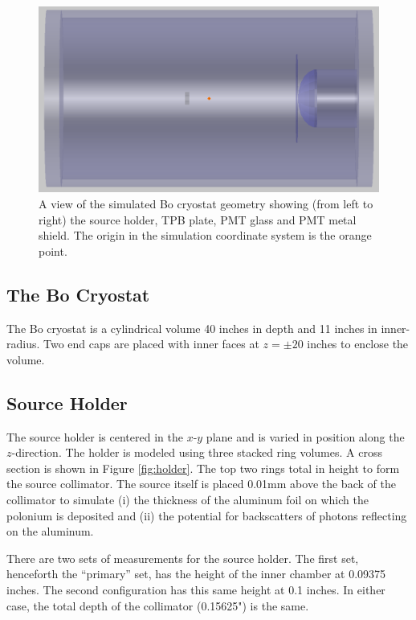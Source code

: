 \documentclass[aps,pra,groupedaddress]{revtex4-1}
\begin{document}
\begin{figure}
	\includegraphics[width=1.0\textwidth]{figures/geo_overview}
	\caption{A view of the simulated Bo cryostat geometry showing (from left to right) the source holder, TPB plate, PMT glass and PMT metal shield. The origin in the simulation coordinate system is the orange point. \label{fig:geo}}
\end{figure}

\subsection{The Bo Cryostat}

The Bo cryostat is a cylindrical volume 40 inches in depth and 11 inches in inner-radius. Two end caps are placed with inner faces at $z=\pm 20$ inches to enclose the volume. 

\subsection{Source Holder}

The source holder is centered in the $x$-$y$ plane and is varied in position along the $z$-direction. The holder is modeled using three stacked ring volumes. A cross section is shown in Figure \ref{fig:holder}. The top two rings total in height to form the source collimator. The source itself is placed 0.01mm above the back of the collimator to simulate (i) the thickness of the aluminum foil on which the polonium is deposited and (ii) the potential for backscatters of photons reflecting on the aluminum.

There are two sets of measurements for the source holder. The first set, henceforth the ``primary'' set, has the height of the inner chamber at 0.09375 inches. The second configuration has this same height at 0.1 inches. In either case, the total depth of the collimator (0.15625") is the same.
\end{document}
